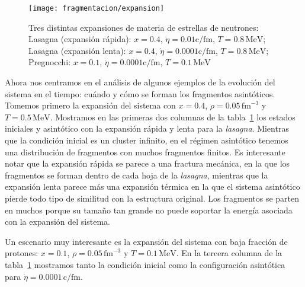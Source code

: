 \begin{figure}
  \centering
  \texttt{[image: fragmentacion/expansion]}
  \caption{Tres distintas expansiones de materia de estrellas de neutrones: Lasagna (expansión rápida): $x = 0.4$, $\dot{\eta} = 0.01\text{c/fm}$, $T = 0.8\,\text{MeV}$;
    Lasagna (expansión lenta): $x = 0.4$, $\dot{\eta} = 0.0001\text{c/fm}$, $T = 0.8\,\text{MeV}$;
    Pregnocchi: $x = 0.1$, $\dot{\eta} = 0.0001\text{c/fm}$, $T = 0.1\,\text{MeV}$}
\label{fig:expansion}
\end{figure}

Ahora nos centramos en el análisis de algunos ejemplos de la evolución del sistema en el tiempo: cuándo y cómo se forman los fragmentos asintóticos.
Tomemos primero la expansión del sistema con $x = 0.4$, $\rho = 0.05\,\text{fm}^{-3}$ y $T = 0.5\,\text{MeV}$.
Mostramos en las primeras dos columnas de la tabla~\ref{fig:expansion} los estados iniciales y asintótico con la expansión rápida y lenta para la \emph{lasagna}.
Mientras que la condición inicial es un cluster infinito, en el régimen asintótico tenemos una distribución de fragmentos con muchos fragmentos finitos.
Es interesante notar que la expansión rápida se parece a una fractura mecánica, en la que los fragmentos se forman dentro de cada hoja de la \emph{lasagna}, mientras que la expansión lenta parece más una expansión térmica en la que el sistema asintótico pierde todo tipo de similitud con la estructura original.
Los fragmentos se parten en muchos porque su tamaño tan grande no puede soportar la energía asociada con la expansión del sistema.

Un escenario muy interesante es la expansión del sistema con baja fracción de protones: $x = 0.1$, $\rho = 0.05\,\text{fm}^{-3}$ y $T = 0.1\,\text{MeV}$.
En la tercera columna de la tabla~\ref{fig:expansion} mostramos tanto la condición inicial como la configuración asintótica para $\dot{\eta} = 0.0001\,\text{c/fm}$.

